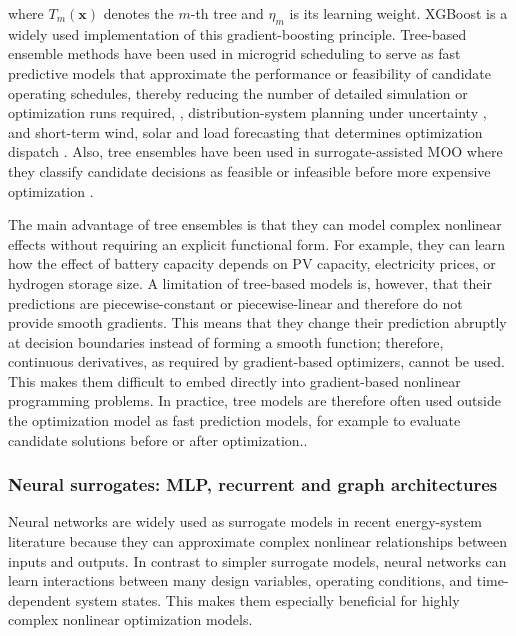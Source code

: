 where $T_m(\mathbf{x})$ denotes the $m$-th tree and $\eta_m$ is its
learning weight. XGBoost is a widely used implementation of this
gradient-boosting principle. Tree-based ensemble methods have been used
in microgrid scheduling to serve as fast predictive models that
approximate the performance or feasibility of candidate operating
schedules, thereby reducing the number of detailed simulation or
optimization runs required,
\cite{Eseye201991463,Faraji2020157284,Wang20192635,Nematollahi2021},
distribution-system planning under uncertainty
\cite{Fu20202904,Fu2022,Jahangiri20244849,Jahangiri2023}, and
short-term wind, solar and load forecasting that determines optimization
dispatch \cite{Li2020,Hanifi2024,Alkesaiberi2022,Madhukumar20228891}.
Also, tree ensembles have been used in surrogate-assisted MOO where they
classify candidate decisions as feasible or infeasible before more
expensive optimization
\cite{Han2018622,Schulte2020,Pang2023,Xiao2018}.

The main advantage of tree ensembles is that they can model complex
nonlinear effects without requiring an explicit functional form. For
example, they can learn how the effect of battery capacity depends on PV
capacity, electricity prices, or hydrogen storage size. A limitation of
tree-based models is, however, that their predictions are
piecewise-constant or piecewise-linear and therefore do not provide
smooth gradients. This means that they change their prediction abruptly
at decision boundaries instead of forming a smooth function; therefore,
continuous derivatives, as required by gradient-based optimizers, cannot
be used. This makes them difficult to embed directly into gradient-based
nonlinear programming problems. In practice, tree models are therefore
often used outside the optimization model as fast prediction models, for
example to evaluate candidate solutions before or after
optimization.\cite{Ren2024,Lin2023,Pang2023,Wang20211767}.

\subsubsection{Neural surrogates: MLP, recurrent and graph architectures}
\label{sec:tax:nn}

Neural networks are widely used as surrogate models in recent
energy-system literature because they can approximate complex nonlinear
relationships between inputs and outputs. In contrast to simpler
surrogate models, neural networks can learn interactions between many
design variables, operating conditions, and time-dependent system
states. This makes them especially beneficial for highly complex
nonlinear optimization models.

